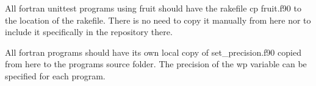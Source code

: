 All fortran unittest programs using fruit should have the rakefile cp fruit.\+f90 to the location of the rakefile. There is no need to copy it manually from here nor to include it specifically in the repository there.

All fortran programs should have its own local copy of set\+\_\+precision.\+f90 copied from here to the program\textquotesingle{}s source folder. The precision of the wp variable can be specified for each program. 